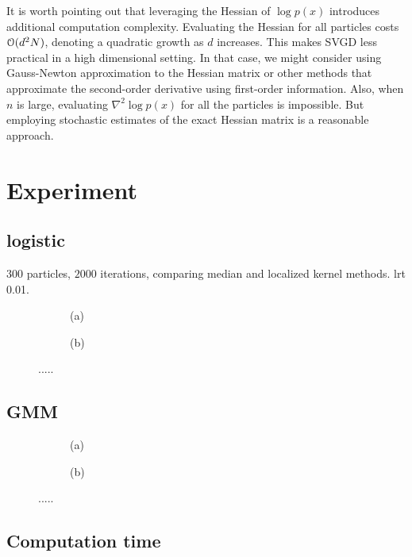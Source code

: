 It is worth pointing out that leveraging the Hessian of $\log p(x)$ introduces additional computation complexity. Evaluating the Hessian for all particles costs $\mathcal{O}(d^2N)$, denoting a quadratic growth as $d$ increases. This makes SVGD less practical in a high dimensional setting. In that case, we might consider using Gauss-Newton approximation to the Hessian matrix or other methods that approximate the second-order derivative using first-order information.
Also, when $n$ is large, evaluating $\nabla^2 \log p(x)$ for all the particles is impossible. But employing  stochastic estimates of the exact Hessian matrix is a reasonable approach.  








\section{Experiment} \label{sec:expt}




\subsection{logistic}

$300$ particles, $2000$ iterations, comparing median and localized kernel methods. lrt 0.01.

\captionsetup[subfigure]{labelformat=empty}
\begin{figure}[t!]
    \centering 
\begin{subfigure}[b]{.48\textwidth} 
    \caption{(a)   \label{fig:logiselbo}}
\end{subfigure}
\hfill
\centering
\begin{subfigure}[b]{0.48\textwidth}
    \caption{(b)  \label{fig:logisksd}}
\end{subfigure}

\caption{.....}
\label{fig:logistic_reg}
\end{figure}



\subsection{GMM}

\captionsetup[subfigure]{labelformat=empty}
\begin{figure}[t!]
    \centering 
\begin{subfigure}[b]{.48\textwidth} 
    \caption{(a)   \label{fig:gmmelbo}}
\end{subfigure}
\hfill
\centering
\begin{subfigure}[b]{0.48\textwidth}
    \caption{(b)  \label{fig:gmmksd}}
\end{subfigure}

\caption{.....}
\label{fig:GMM}
\end{figure}


\subsection{Computation time}
